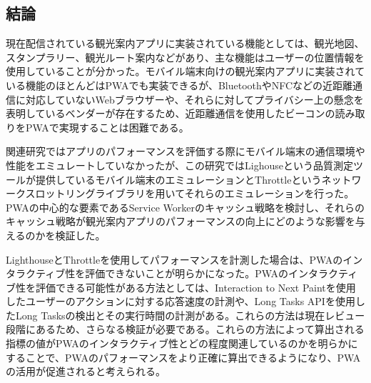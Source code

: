 \subsection{結論}
\label{subsection:結論}
現在配信されている観光案内アプリに実装されている機能としては、観光地図、スタンプラリー、観光ルート案内などがあり、主な機能はユーザーの位置情報を使用していることが分かった。モバイル端末向けの観光案内アプリに実装されている機能のほとんどはPWAでも実装できるが、BluetoothやNFCなどの近距離通信に対応していないWebブラウザーや、それらに対してプライバシー上の懸念を表明しているベンダーが存在するため、近距離通信を使用したビーコンの読み取りをPWAで実現することは困難である。

関連研究ではアプリのパフォーマンスを評価する際にモバイル端末の通信環境や性能をエミュレートしていなかったが、この研究ではLighouseという品質測定ツールが提供しているモバイル端末のエミュレーションとThrottleというネットワークスロットリングライブラリを用いてそれらのエミュレーションを行った。PWAの中心的な要素であるService Workerのキャッシュ戦略を検討し、それらのキャッシュ戦略が観光案内アプリのパフォーマンスの向上にどのような影響を与えるのかを検証した。

LighthouseとThrottleを使用してパフォーマンスを計測した場合は、PWAのインタラクティブ性を評価できないことが明らかになった。PWAのインタラクティブ性を評価できる可能性がある方法としては、Interaction to Next Paintを使用したユーザーのアクションに対する応答速度の計測や、Long Tasks APIを使用したLong Tasksの検出とその実行時間の計測がある。これらの方法は現在レビュー段階にあるため、さらなる検証が必要である。これらの方法によって算出される指標の値がPWAのインタラクティブ性とどの程度関連しているのかを明らかにすることで、PWAのパフォーマンスをより正確に算出できるようになり、PWAの活用が促進されると考えられる。